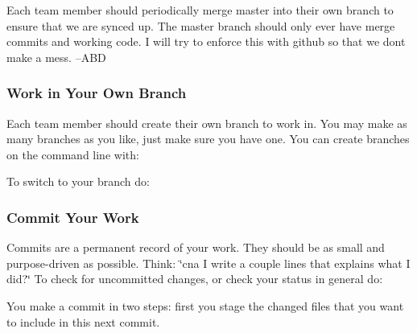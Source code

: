 Each team member should periodically merge master into their own branch to ensure that we are synced up. The master branch should only ever have merge commits and working code. I will try to enforce this with github so that we don\textquotesingle{}t make a mess. --A\+BD\hypertarget{index_autotoc_md3}{}\subsubsection{Work in Your Own Branch}\label{index_autotoc_md3}
Each team member should create their own branch to work in. You may make as many branches as you like, just make sure you have one. You can create branches on the command line with\+: 
\begin{DoxyCode}{0}
\end{DoxyCode}
 To switch to your branch do\+: 
\begin{DoxyCode}{0}
\end{DoxyCode}
\hypertarget{index_autotoc_md4}{}\subsubsection{Commit Your Work}\label{index_autotoc_md4}
Commits are a permanent record of your work. They should be as small and purpose-\/driven as possible. Think\+: \char`\"{}cna I write a couple lines that explains what I did?\char`\"{} To check for uncommitted changes, or check your status in general do\+: 
\begin{DoxyCode}{0}
\DoxyCodeLine{}
\DoxyCodeLine{}
\DoxyCodeLine{}
\DoxyCodeLine{}
\end{DoxyCode}
 You make a commit in two steps\+: first you stage the changed files that you want to include in this next commit. 
\begin{DoxyCode}{0}
\end{DoxyCode}
